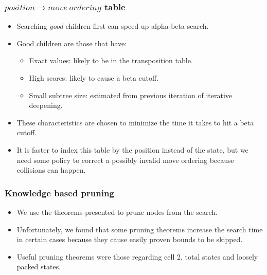 \documentclass{beamer}
\begin{document}
    \begin{frame}
        \frametitle{$position \rightarrow move\ ordering$ table}
        \begin{itemize}
            \item Searching \textit{good} children first can speed up alpha-beta search.
            \item Good children are those that have:
                \begin{itemize}
                    \item Exact values: likely to be in the transposition table.
                    \item High scores: likely to cause a beta cutoff.
                    \item Small subtree size: estimated from previous iteration of iterative deepening.
                \end{itemize}
            \item These characteristics are chosen to minimize the time it takes to hit a beta cutoff.
            \item It is faster to index this table by the position instead of the state, but we need some policy
                to correct a possibly invalid move ordering because collisions can happen.
        \end{itemize}
    \end{frame}

    \begin{frame}
        \frametitle{Knowledge based pruning}
        \begin{itemize}
            \item We use the theorems presented to prune nodes from the search.
            \item Unfortunately, we found that some pruning theorems increase the search time
                in certain cases because they cause easily proven bounds to be skipped.
            \item Useful pruning theorems were those regarding cell 2, total states and loosely packed states.
        \end{itemize}
    \end{frame}
\end{document}
